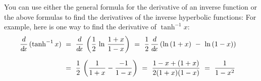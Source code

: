 \noindent You can use either the general formula for the derivative of an
inverse function or the above formulas to find the derivatives of the inverse
hyperbolic functions:
\newpage
{}
For example, here is one way to find the derivative of $\tanh^{-1} x$:
\begin{align*}
\frac{d}{d\!x}\,(\tanh^{-1} x) ~&=~ \frac{d}{d\!x}\,\left(\frac{1}{2}\,\ln\,\frac{1+x}{1-x}\right) ~=~
\frac{1}{2}\,\frac{d}{d\!x}\,(\ln\,(1+x) ~-~ \ln\,(1-x))\\[6pt]
&=~ \frac{1}{2}\,\left(\frac{1}{1+x} - \frac{-1}{1-x}\right)
~=~ \frac{1-x + (1+x)}{2 (1+x)(1-x)} ~=~ \frac{1}{1-x^2} \quad\relax
\end{align*}\vspace{-5mm}


